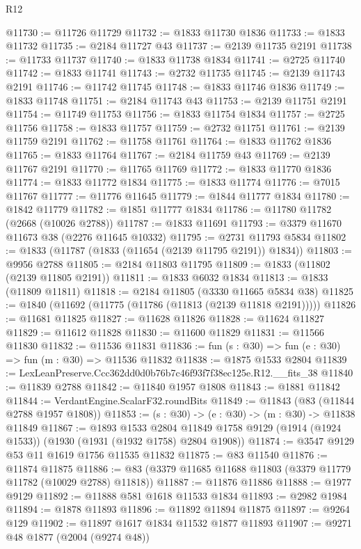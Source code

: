 \begin{lexlean}{R12}
\begin{coremodule}
@11730 := @11726 @11729
@11732 := @1833 @11730 @1836
@11733 := @1833 @11732
@11735 := @2184 @11727 @43
@11737 := @2139 @11735 @2191
@11738 := @11733 @11737
@11740 := @1833 @11738 @1834
@11741 := @2725 @11740
@11742 := @1833 @11741
@11743 := @2732 @11735
@11745 := @2139 @11743 @2191
@11746 := @11742 @11745
@11748 := @1833 @11746 @1836
@11749 := @1833 @11748
@11751 := @2184 @11743 @43
@11753 := @2139 @11751 @2191
@11754 := @11749 @11753
@11756 := @1833 @11754 @1834
@11757 := @2725 @11756
@11758 := @1833 @11757
@11759 := @2732 @11751
@11761 := @2139 @11759 @2191
@11762 := @11758 @11761
@11764 := @1833 @11762 @1836
@11765 := @1833 @11764
@11767 := @2184 @11759 @43
@11769 := @2139 @11767 @2191
@11770 := @11765 @11769
@11772 := @1833 @11770 @1836
@11774 := @1833 @11772 @1834
@11775 := @1833 @11774
@11776 := @7015 @11767
@11777 := @11776 @11645
@11779 := @1844 @11777 @1834
@11780 := @1842 @11779
@11782 := @1851 @11777 @1834
@11786 := @11780 @11782 (@2668 (@10026 @2788))
@11787 := @1833 @11691
@11793 := @3379 @11670 @11673 @38 (@2276 @11645 @10332)
@11795 := @2731 @11793 @5834
@11802 := @1833 (@11787 (@1833 (@11654 (@2139 @11795 @2191)) @1834))
@11803 := @9956 @2788
@11805 := @2184 @11803 @11795
@11809 := @1833 (@11802 (@2139 @11805 @2191))
@11811 := @1833 @6032 @1834
@11813 := @1833 (@11809 @11811)
@11818 := @2184 @11805 (@3330 @11665 @5834 @38)
@11825 := @1840 (@11692 (@11775 (@11786 (@11813 (@2139 @11818 @2191)))))
@11826 := @11681 @11825
@11827 := @11628 @11826
@11828 := @11624 @11827
@11829 := @11612 @11828
@11830 := @11600 @11829
@11831 := @11566 @11830
@11832 := @11536 @11831
@11836 := fun (s : @30) => fun (e : @30) => fun (m : @30) => @11536 @11832
@11838 := @1875 @1533 @2804
@11839 := LexLeanPreserve.Ccc362dd0d0b76b7c46f93f7f38ec125e.R12.__fits_38
@11840 := @11839 @2788
@11842 := @11840 @1957 @1808
@11843 := @1881 @11842
@11844 := VerdantEngine.ScalarF32.roundBits
@11849 := @11843 (@83 (@11844 @2788 @1957 @1808))
@11853 := (s : @30) -> (e : @30) -> (m : @30) -> @11838 @11849
@11867 := @1893
    @1533
    @2804
    @11849
    @1758
    @9129
    (@1914 (@1924 @1533))
    (@1930 (@1931 (@1932 @1758) @2804 @1908))
@11874 := @3547 @9129 @53 @11 @1619 @1756 @11535 @11832
@11875 := @83 @11540
@11876 := @11874 @11875
@11886 := @83 (@3379 @11685 @11688 @11803 (@3379 @11779 @11782 (@10029 @2788) @11818))
@11887 := @11876 @11886
@11888 := @1977 @9129
@11892 := @11888 @581 @1618 @11533 @1834
@11893 := @2982 @1984
@11894 := @1878 @11893
@11896 := @11892 @11894 @11875
@11897 := @9264 @129
@11902 := @11897 @1617 @1834 @11532 @1877 @11893
@11907 := @9271 @48 @1877 (@2004 (@9274 @48))

\end{coremodule}
\end{lexlean}
